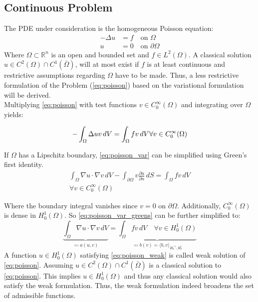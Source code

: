 \documentclass[11pt,a4paper]{article}
\begin{document}
\begin{multicols}{2}

\subsection*{Continuous Problem}
The PDE under consideration is the homogeneous Poisson equation:
\begin{equation} \label{eq:poisson}
  \begin{split}
    - \Delta u &= f \quad \text{on } \Omega\\
    u &= 0 \quad \text{on } \partial\Omega
  \end{split}
\end{equation}
Where $\Omega \subset \mathbb{R}^n$ is an open and bounded set and $f \in L^2(\Omega)$.
A classical solution $u \in C^2(\Omega) \cap C^1(\bar{\Omega})$, will at most
exist if $f$ is at least continuous and restrictive assumptions regarding $\Omega$ have to be made.
Thus, a less restrictive formulation of the Problem (\ref{eq:poisson}) based on
the variational formulation will be derived.\\

Multiplying \autoref{eq:poisson} with test functions $v \in C^\infty_0(\Omega)$ and
integrating over $\Omega$ yields:

\begin{equation} \label{eq:poisson_var}
    - \int_\Omega \Delta u v\,dV = \int_\Omega fv\,dV \\ \forall v \in C^\infty_0(\Omega)
\end{equation}

If $\Omega$ has a Lipschitz boundary, \autoref{eq:poisson_var} can be simplified
using Green's first identity.
\begin{multline}\label{eq:poisson_var_greens}
    \int_\Omega \nabla u \cdot \nabla v \,dV
  - \int_{\partial\Omega} v \frac{\partial u}{\partial n} \,dS
  = \int_\Omega fv\,dV \\ \forall v \in C^\infty_0(\Omega)
\end{multline}

Where the boundary integral vanishes since $v = 0$ on $\partial\Omega$.
Additionally, $C^\infty_0(\Omega)$ is dense in $H^1_0(\Omega)$.
So \autoref{eq:poisson_var_greens} can be further simplified to:
\begin{equation} \label{eq:poisson_weak}
  \underbrace{\int_\Omega \nabla u \cdot \nabla v \,dV}_{\eqqcolon a(u,v)}
  = \underbrace{\int_\Omega fv\,dV \quad \forall v \in
  H^1_0(\Omega)}_{\eqqcolon b(v) = \langle b, v \rangle_{H^{-1}_0, H^1_0}}
\end{equation}
A function $u \in H^1_0(\Omega)$ satisfying \autoref{eq:poisson_weak} is called
weak solution of \autoref{eq:poisson}.
Assuming $u \in C^2(\Omega) \cap C^1(\bar{\Omega})$ is a classical solution to
\autoref{eq:poisson}. This implies $u \in H^1_0(\Omega)$ and thus any classical
solution would also satisfy the weak formulation. Thus, the weak formulation
indeed broadens the set of admissible functions.


\end{multicols}
\end{document}

